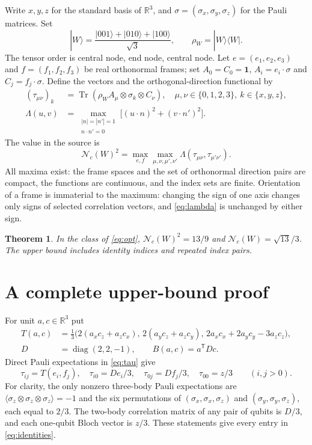 \documentclass[11pt,a4paper]{article}
\newtheorem{theorem}{Theorem}
\newcommand{\Tr}{\operatorname{Tr}}
\newcommand{\Nc}{\mathcal N_c}
\newcommand{\R}{\mathbb R}
\begin{document}
Write $x,y,z$ for the standard basis of $\R^3$, and
$\sigma=(\sigma_x,\sigma_y,\sigma_z)$ for the Pauli matrices. Set
\[
 |W\rangle=\frac{|001\rangle+|010\rangle+|100\rangle}{\sqrt3},
 \qquad \rho_W=|W\rangle\langle W|.
\]
The tensor order is central node, end node, central node. Let
$e=(e_1,e_2,e_3)$ and $f=(f_1,f_2,f_3)$ be real orthonormal frames;
set $A_0=C_0=\mathbf1$, $A_i=e_i\cdot\sigma$ and $C_j=f_j\cdot\sigma$.
Define the vectors and the orthogonal-direction functional by
\begin{align}
 (\tau_{\mu\nu})_k
 &=\Tr(\rho_W A_\mu\otimes\sigma_k\otimes C_\nu),
 \quad \mu,\nu\in\{0,1,2,3\},\ k\in\{x,y,z\},\label{eq:tau}\\
 \Lambda(u,v)&=\max_{\substack{|n|=|n'|=1\\n\cdot n'=0}}
       \bigl[(u\cdot n)^2+(v\cdot n')^2\bigr].\label{eq:lambda}
\end{align}
The value in the source is
\begin{equation}
 \Nc(W)^2=\max_{e,f}\max_{\mu,\nu,\mu',\nu'}
       \Lambda(\tau_{\mu\nu},\tau_{\mu'\nu'}).\label{eq:opt}
\end{equation}
All maxima exist: the frame spaces and the set of orthonormal direction
pairs are compact, the functions are continuous, and the index sets are
finite. Orientation of a frame is immaterial to the maximum: changing the
sign of one axis changes only signs of selected correlation vectors, and
\eqref{eq:lambda} is unchanged by either sign.

\begin{theorem}\label{thm:main}
In the class of \eqref{eq:opt}, $\Nc(W)^2=13/9$ and
$\Nc(W)=\sqrt{13}/3$. The upper bound includes identity indices and
repeated index pairs.
\end{theorem}

\section{A complete upper-bound proof}
For unit $a,c\in\R^3$ put
\begin{align}
 T(a,c)&=\frac13\bigl(2(a_xc_z+a_zc_x),\,
             2(a_yc_z+a_zc_y),\,
             2a_xc_x+2a_yc_y-3a_zc_z\bigr),\label{eq:T}\\
 D&=\operatorname{diag}(2,2,-1),\qquad B(a,c)=a^{\mathsf T}Dc.
\end{align}
Direct Pauli expectations in \eqref{eq:tau} give
\begin{equation}\label{eq:identities}
 \tau_{ij}=T(e_i,f_j),\quad
 \tau_{i0}=De_i/3,\quad \tau_{0j}=Df_j/3,\quad \tau_{00}=z/3
 \qquad(i,j>0).
\end{equation}
For clarity, the only nonzero three-body Pauli expectations are
$\langle\sigma_z\otimes\sigma_z\otimes\sigma_z\rangle=-1$
and the six permutations of $(\sigma_x,\sigma_x,\sigma_z)$ and
$(\sigma_y,\sigma_y,\sigma_z)$, each equal to $2/3$.
The two-body correlation matrix of any pair of qubits is $D/3$,
and each one-qubit Bloch vector is $z/3$. These statements give every
entry in \eqref{eq:identities}.
\end{document}
